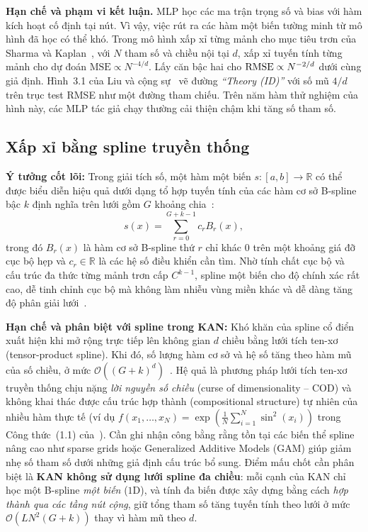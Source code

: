 \textbf{Hạn chế và phạm vi kết luận.} MLP học các ma trận trọng số và bias với hàm kích hoạt cố định tại nút. Vì vậy, việc rút ra các hàm một biến tường minh từ mô hình đã học có thể khó. Trong mô hình xấp xỉ từng mảnh cho mục tiêu trơn của Sharma và Kaplan~\cite{sharma2020neural}, với $N$ tham số và chiều nội tại $d$, xấp xỉ tuyến tính từng mảnh cho dự đoán $\mathrm{MSE} \propto N^{-4/d}$. Lấy căn bậc hai cho $\operatorname{RMSE} \propto N^{-2/d}$ dưới cùng giả định. Hình~3.1 của Liu và cộng sự~\cite{liu2025kan} vẽ đường \emph{``Theory (ID)''} với số mũ $4/d$ trên trục test RMSE như một đường tham chiếu. Trên năm hàm thử nghiệm của hình này, các MLP tác giả chạy thường cải thiện chậm khi tăng số tham số.

\subsection{Xấp xỉ bằng spline truyền thống}
\textbf{Ý tưởng cốt lõi:} Trong giải tích số, một hàm một biến $s : [a, b] \to \mathbb{R}$ có thể được biểu diễn hiệu quả dưới dạng tổ hợp tuyến tính của các hàm cơ sở B-spline bậc $k$ định nghĩa trên lưới gồm $G$ khoảng chia~\cite{deboor1978practical,liu2025kan}:
\begin{equation}\label{eq:bspline-1d}
s(x) = \sum_{r=0}^{G+k-1} c_r B_r(x),
\end{equation}
trong đó $B_r(x)$ là hàm cơ sở B-spline thứ $r$ chỉ khác $0$ trên một khoảng giá đỡ cục bộ hẹp và $c_r \in \mathbb{R}$ là các hệ số điều khiển cần tìm. Nhờ tính chất cục bộ và cấu trúc đa thức từng mảnh trơn cấp $C^{k-1}$, spline một biến cho độ chính xác rất cao, dễ tinh chỉnh cục bộ mà không làm nhiễu vùng miền khác và dễ dàng tăng độ phân giải lưới~\cite{liu2025kan}.

\textbf{Hạn chế và phân biệt với spline trong KAN:} Khó khăn của spline cổ điển xuất hiện khi mở rộng trực tiếp lên không gian $d$ chiều bằng lưới tích ten-xơ (tensor-product spline). Khi đó, số lượng hàm cơ sở và hệ số tăng theo hàm mũ của số chiều, ở mức $\mathcal{O}\!\left((G+k)^d\right)$~\cite{liu2025kan}. Hệ quả là phương pháp lưới tích ten-xơ truyền thống chịu nặng \emph{lời nguyền số chiều} (curse of dimensionality -- COD) và không khai thác được cấu trúc hợp thành (compositional structure) tự nhiên của nhiều hàm thực tế (ví dụ $f(x_1,\dots,x_N)=\exp(\frac{1}{N}\sum_{i=1}^N \sin^2(x_i))$ trong Công thức~(1.1) của~\cite{liu2025kan}). Cần ghi nhận công bằng rằng tồn tại các biến thể spline nâng cao như sparse grids hoặc Generalized Additive Models (GAM) giúp giảm nhẹ số tham số dưới những giả định cấu trúc bổ sung. Điểm mấu chốt cần phân biệt là \textbf{KAN không sử dụng lưới spline đa chiều}: mỗi cạnh của KAN chỉ học một B-spline \emph{một biến} ($1\text{D}$), và tính đa biến được xây dựng bằng cách \emph{hợp thành qua các tầng nút cộng}, giữ tổng tham số tăng tuyến tính theo lưới ở mức $\mathcal{O}(LN^2(G+k))$ thay vì hàm mũ theo $d$.

